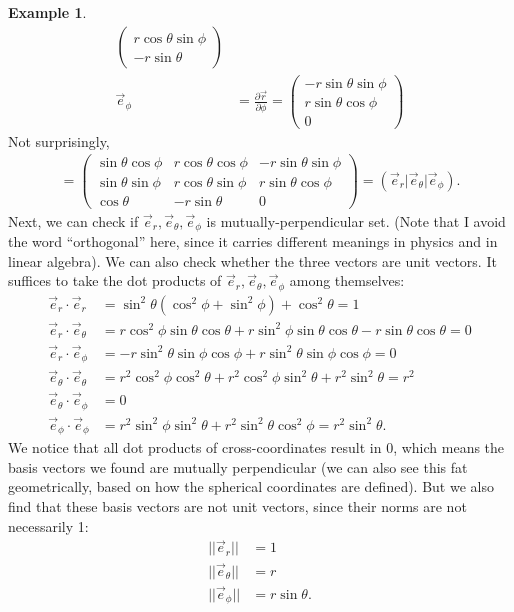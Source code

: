 \documentclass{article}
\theoremstyle{definition}
\newtheorem{exmp}{Example}[section]
\begin{document}
\begin{exmp}
\begin{align*}
\begin{pmatrix}
r\cos\theta\sin\phi\\
-r\sin\theta
\end{pmatrix}\\
\vec{e}_\phi &= \frac{\partial \vec{r}}{\partial \phi}=
\begin{pmatrix}
-r\sin\theta\sin\phi\\
r\sin\theta\cos\phi\\
0
\end{pmatrix}
\end{align*} 
Not surprisingly,
\begin{align*}
[U^{j'}_i] = 
\begin{pmatrix}
\sin\theta\cos\phi & r\cos\theta\cos\phi & -r\sin\theta\sin\phi \\
\sin\theta\sin\phi & r\cos\theta\sin\phi & r\sin\theta\cos\phi \\
\cos\theta & -r\sin\theta & 0
\end{pmatrix}
=
\left( \vec{e}_r \vert \vec{e}_\theta \vert \vec{e}_\phi \right).
\end{align*}
Next, we can check if ${\vec{e}_r, \vec{e}_\theta, \vec{e}_\phi}$ is mutually-perpendicular set. (Note that I avoid the word ``orthogonal'' here, since it carries different meanings in physics and in linear algebra). We can also check whether the three vectors are unit vectors. It suffices to take the dot products of ${\vec{e}_r, \vec{e}_\theta, \vec{e}_\phi}$ among themselves:
\begin{align*}
\vec{e}_r\cdot\vec{e}_r &= \sin^2\theta(\cos^2\phi + \sin^2\phi) + \cos^2\theta = 1\\
\vec{e}_r\cdot\vec{e}_\theta &= r\cos^2\phi\sin\theta\cos\theta + r\sin^2\phi\sin\theta\cos\theta - r\sin\theta\cos\theta = 0\\
\vec{e}_r\cdot\vec{e}_\phi &= -r\sin^2\theta\sin\phi\cos\phi + r\sin^2\theta\sin\phi\cos\phi = 0\\ 
\vec{e}_\theta\cdot\vec{e}_\theta &= r^2\cos^2\phi\cos^2\theta + r^2\cos^2\phi\sin^2\theta + r^2\sin^2\theta = r^2\\ 
\vec{e}_\theta\cdot\vec{e}_\phi &= 0 \\
\vec{e}_\phi\cdot\vec{e}_\phi &= r^2\sin^2\phi\sin^2\theta + r^2\sin^2\theta\cos^2\phi = r^2\sin^2\theta.
\end{align*}
We notice that all dot products of cross-coordinates result in 0, which means the basis vectors we found are mutually perpendicular (we can also see this fat geometrically, based on how the spherical coordinates are defined). But we also find that these basis vectors are not unit vectors, since their norms are not necessarily 1:
\begin{align*}
\vert\vert \vec{e}_r \vert\vert &= 1\\
\vert\vert \vec{e}_\theta \vert\vert &= r\\
\vert\vert \vec{e}_\phi \vert\vert &= r\sin\theta.
\end{align*}
\end{exmp}
\end{document}
